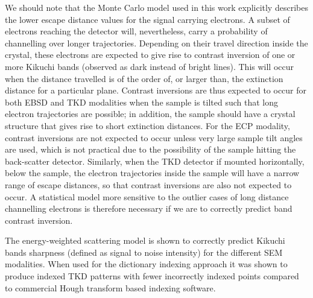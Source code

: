 We should note that the Monte Carlo model used in this work explicitly describes the lower escape distance values for the signal carrying electrons.  A subset of electrons reaching the detector will, nevertheless, carry a probability of channelling over longer trajectories. Depending on their travel direction inside the crystal, these electrons are expected to give rise to contrast inversion of one or more Kikuchi bands (observed as dark instead of bright lines). This will occur when the distance travelled is of the order of, or larger than, the extinction distance for a particular plane. Contrast inversions are thus expected to occur for both EBSD and TKD modalities when the sample is tilted such that long electron trajectories are possible; in addition, the sample should have a crystal structure that gives rise to short extinction distances. For the ECP modality, contrast inversions are not expected to occur unless very large sample tilt angles are used, which is not practical due to the possibility of the sample hitting the back-scatter detector. Similarly, when the TKD detector if mounted horizontally, below the sample, the electron trajectories inside the sample will have a narrow range of escape distances, so that contrast inversions are also not expected to occur. A statistical model more sensitive to the outlier cases of long distance channelling electrons is therefore necessary if we are to correctly predict band contrast inversion. 

The energy-weighted scattering model is shown to correctly predict Kikuchi bands sharpness (defined as signal to noise intensity) for the different SEM modalities. When used for the dictionary indexing approach it was shown to produce indexed TKD patterns with fewer incorrectly indexed points compared to commercial Hough transform based indexing software. 
